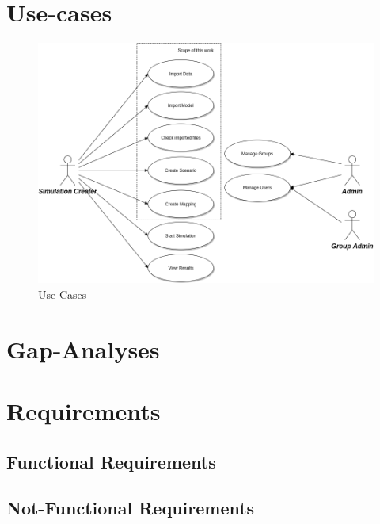 \section{Use-cases}
\begin{figure}[H]
	\centering\includegraphics[width=1\textwidth]{res/Use-Cases}
	\caption{Use-Cases}
	\label{fig:use-cases}
\end{figure}


\section{Gap-Analyses}


\section{Requirements}

\subsection{Functional Requirements}

\subsection{Not-Functional Requirements}
